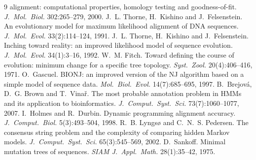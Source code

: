 \documentclass[11pt]{article}
\begin{document}
\begin{thebibliography}{9}
alignment: computational properties, homology testing and goodness-of-fit.
\emph{J.\ Mol.\ Biol.} 302:265--279, 2000.
J.~L. Thorne, H.~Kishino and J.~Felsenstein. An evolutionary model for
maximum likelihood alignment of DNA sequences. \emph{J.\ Mol.\ Evol.}
33(2):114--124, 1991.
J.~L. Thorne, H.~Kishino and J.~Felsenstein. Inching toward reality: an
improved likelihood model of sequence evolution. \emph{J.\ Mol.\ Evol.}
34(1):3--16, 1992.
W.~M. Fitch. Toward defining the course of evolution: minimum change for a
specific tree topology. \emph{Syst.\ Zool.} 20(4):406--416, 1971.
O.~Gascuel. BIONJ: an improved version of the NJ algorithm based on a simple
model of sequence data. \emph{Mol.\ Biol.\ Evol.} 14(7):685--695, 1997.
B.~Brejov{\'a}, D.~G. Brown and T.~Vina{\v r}. The most probable annotation problem in HMMs
and its application to bioinformatics. \emph{J.\ Comput.\ Syst.\ Sci.} 73(7):1060--1077, 2007.
I.~Holmes and R.~Durbin. Dynamic programming alignment accuracy. \emph{J.\ Comput.\ Biol.}
5(3):493--504, 1998.
R.~B. Lyngs{\o} and C.~N.~S. Pedersen. The consensus string problem and the complexity of
comparing hidden Markov models. \emph{J.\ Comput.\ Syst.\ Sci.} 65(3):545--569, 2002.
D.~Sankoff. Minimal mutation trees of sequences. \emph{SIAM J.\ Appl.\ Math.}
28(1):35--42, 1975.
\end{thebibliography}
\end{document}
